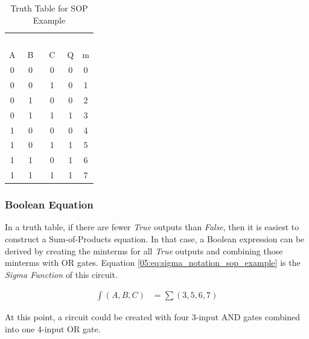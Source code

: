 \begin{table}[H]
  \sffamily
  \newcommand{\head}[1]{\textcolor{white}{\textbf{#1}}}    
  \begin{center}
    \begin{tabular}{ccc|cc} 
      \rowcolor{black!75}
      \multicolumn{3}{c}{\head{Inputs}} & \multicolumn{2}{c}{\head{Outputs}} \\
      A & B & C & Q & m\\
      \hline
      0 & 0 & 0 & 0 & 0 \\
      0 & 0 & 1 & 0 & 1 \\
      0 & 1 & 0 & 0 & 2 \\
      0 & 1 & 1 & 1 & 3 \\
      1 & 0 & 0 & 0 & 4 \\
      1 & 0 & 1 & 1 & 5 \\
      1 & 1 & 0 & 1 & 6 \\
      1 & 1 & 1 & 1 & 7 
    \end{tabular}
  \end{center}
  \caption{Truth Table for SOP Example}
  \label{05:tab:truth_table_for_sop_example}
\end{table}

\subsubsection{Boolean Equation}
\label{05:subsubsec:boolean_equation_sop_example}

In a truth table, if there are fewer \emph{True} outputs than \emph{False}, then it is easiest to construct a Sum-of-Products equation. In that case, a Boolean expression can be derived by creating the minterms for all \emph{True} outputs and combining those minterms with \textsf{OR}  gates. Equation \ref{05:eq:sigma_notation_sop_example} is the \emph{Sigma Function} of this circuit.

\begin{align}
  \label{05:eq:sigma_notation_sop_example}
  \int(A,B,C) &= \sum(3,5,6,7)
\end{align}


At this point, a circuit could be created with four 3-input \textsf{AND}  gates combined into one 4-input \textsf{OR}  gate.

